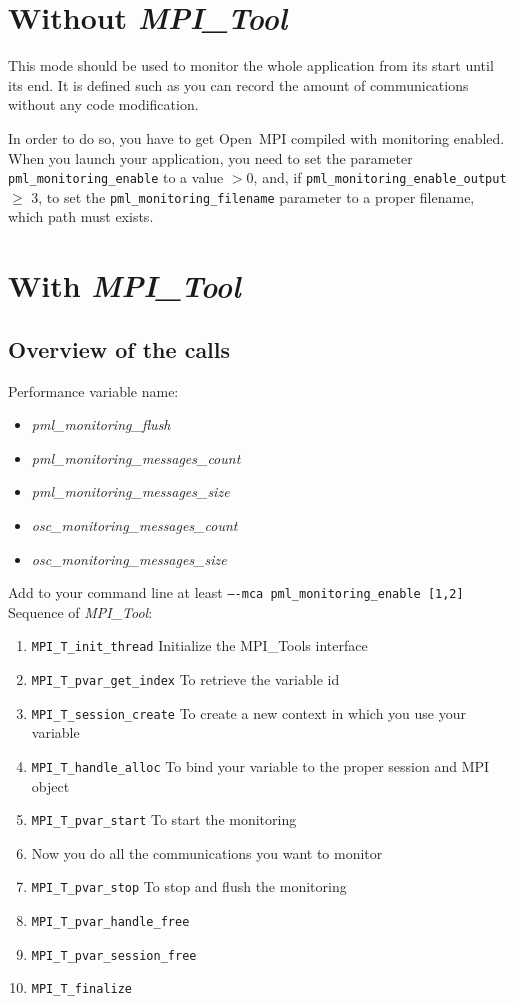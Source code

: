 \documentclass[notitlepage]{article}
\newcommand{\mpit}[1]{\textit{MPI\_Tool#1}}
\begin{document}
\section{Without \mpit{}}

This mode should be used to monitor the whole application from
its start until its end. It is defined such as you can record the
amount of communications without any code modification.

In order to do so, you have to get Open~MPI compiled with monitoring
enabled. When you launch your application, you need to set the
parameter \texttt{pml\_monitoring\_enable} to a value $> 0$, and, if
\texttt{pml\_monitoring\_enable\_output} $\ge$ 3, to set the
\texttt{pml\_monitoring\_filename} parameter to a proper filename,
which path must exists.

\section{With \mpit{}}

\subsection{Overview of the calls}

Performance variable name:
\begin{itemize}
\item \textit{pml\_monitoring\_flush}
\item \textit{pml\_monitoring\_messages\_count}
\item \textit{pml\_monitoring\_messages\_size}
\item \textit{osc\_monitoring\_messages\_count}
\item \textit{osc\_monitoring\_messages\_size}
\end{itemize}
Add to your command line at least \texttt{----mca pml\_monitoring\_enable [1,2]} \\
Sequence of \mpit{}:
\begin{enumerate}
\item {\texttt{MPI\_T\_init\_thread}} Initialize the MPI\_Tools
  interface
\item {\texttt{MPI\_T\_pvar\_get\_index}} To retrieve the variable id
\item {\texttt{MPI\_T\_session\_create}} To create a new context
  in which you use your variable
\item {\texttt{MPI\_T\_handle\_alloc}} To bind your variable to the
  proper session and MPI object
\item {\texttt{MPI\_T\_pvar\_start}} To start the monitoring
\item Now you do all the communications you want to monitor
\item {\texttt{MPI\_T\_pvar\_stop}} To stop and flush the monitoring
\item {\texttt{MPI\_T\_pvar\_handle\_free}}
\item {\texttt{MPI\_T\_pvar\_session\_free}}
\item {\texttt{MPI\_T\_finalize}}
\end{enumerate}
\end{document}
